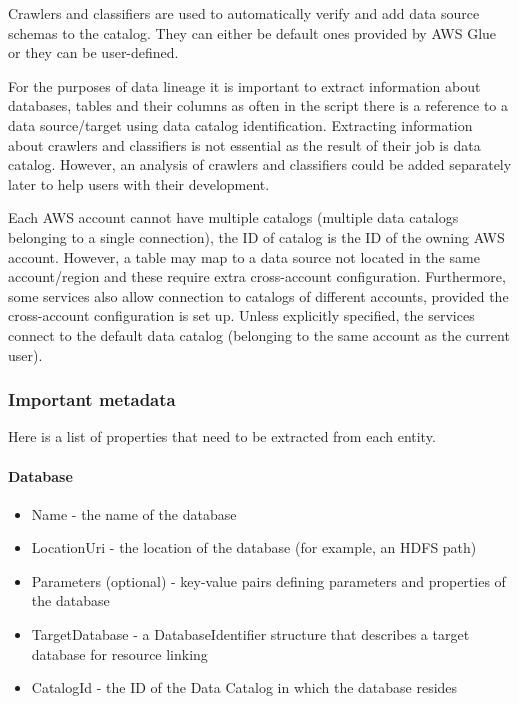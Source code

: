 Crawlers and classifiers are used to automatically verify and add data source schemas to the catalog. They can either be default ones provided by AWS Glue or they can be user-defined. 

For the purposes of data lineage it is important to extract information about databases, tables and their columns as often in the script there is a reference to a data source/target using data catalog identification. Extracting information about crawlers and classifiers is not essential as the result of their job is data catalog. However, an analysis of crawlers and classifiers could be added separately later to help users with their development.

Each AWS account cannot have multiple catalogs (multiple data catalogs belonging to a single connection), the ID of catalog is the ID of the owning AWS account. However, a table may map to a data source not located in the same account/region and these require extra cross-account configuration. Furthermore, some services also allow connection to catalogs of different accounts, provided the cross-account configuration is set up. Unless explicitly specified, the services connect to the default data catalog (belonging to the same account as the current user).

\subsubsection{Important metadata}
Here is a list of properties that need to be extracted from each entity.

\paragraph{Database}
\begin{itemize}
    \item Name - the name of the database
    \item LocationUri - the location of the database (for example, an HDFS path)
    \item Parameters (optional) - key-value pairs defining parameters and properties of the database
    \item TargetDatabase - a DatabaseIdentifier structure that describes a target database for resource linking
    \item CatalogId - the ID of the Data Catalog in which the database resides
\end{itemize}


